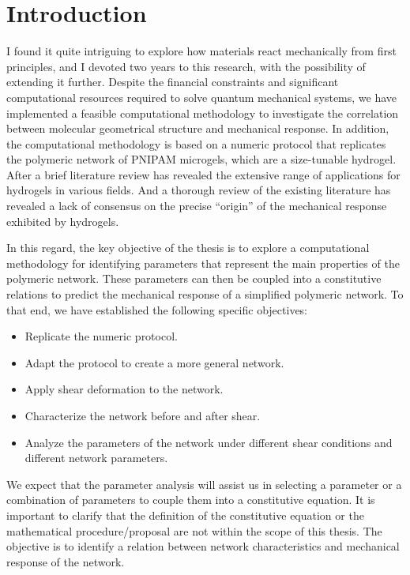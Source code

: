 \chapter{Introduction}\label{ch1:Intro}



I found it quite intriguing to explore how materials react mechanically from first principles, and I devoted two years to this research, with the possibility of extending it further.
Despite the financial constraints and significant computational resources required to solve quantum mechanical systems, we have implemented a feasible computational methodology to investigate the correlation between molecular geometrical structure and mechanical response.
In addition, the computational methodology is based on a numeric protocol that replicates the polymeric network of PNIPAM microgels, which are a size-tunable hydrogel.
After a brief literature review has revealed the extensive range of applications for hydrogels in various fields.
And a thorough review of the existing literature has revealed a lack of consensus on the precise ``origin'' of the mechanical response exhibited by hydrogels.

In this regard, the key objective of the thesis is to explore a computational methodology for identifying parameters that represent the main properties of the polymeric network. 
These parameters can then be coupled into a constitutive relations to predict the mechanical response of a simplified polymeric network.
To that end, we have established the following specific objectives:
\begin{itemize}
    \item Replicate the numeric protocol.
    \item Adapt the protocol to create a more general network.
    \item Apply shear deformation to the network.
    \item Characterize the network before and after shear.
    \item Analyze the parameters of the network under different shear conditions and different network parameters.
\end{itemize}
We expect that the parameter analysis will assist us in selecting a parameter or a combination of parameters to couple them into a constitutive equation.
It is important to clarify that the definition of the constitutive equation or the mathematical procedure/proposal are not within the scope of this thesis. 
The objective is to identify a relation between network characteristics and mechanical response of the network.

